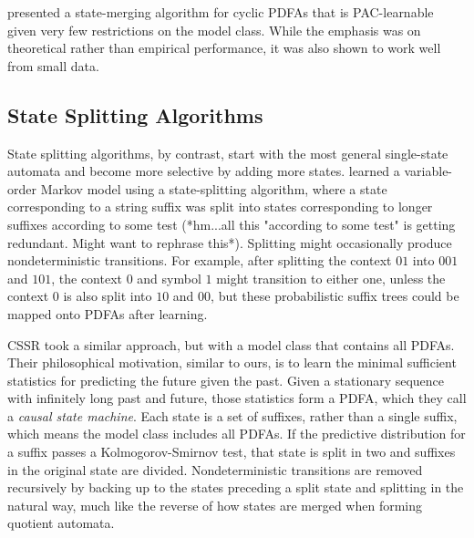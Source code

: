 \cite{Clark2004} presented a state-merging algorithm for cyclic PDFAs that is PAC-learnable given very few restrictions on the model class.  While the emphasis was on theoretical rather than empirical performance, it was also shown to work well from small data.

\subsection{State Splitting Algorithms}

State splitting algorithms, by contrast, start with the most general single-state automata and become more selective by adding more states.  \cite{Ron1995} learned a variable-order Markov model using a state-splitting algorithm, where a state corresponding to a string suffix was split into states corresponding to longer suffixes according to some test (*hm...all this "according to some test" is getting redundant.  Might want to rephrase this*).  Splitting might occasionally produce nondeterministic transitions.  For example, after splitting the context $01$ into $001$ and $101$, the context $0$ and symbol $1$ might transition to either one, unless the context $0$ is also split into $10$ and $00$, but these probabilistic suffix trees could be mapped onto PDFAs after learning.

CSSR \cite{Shalizi2004} took a similar approach, but with a model class that contains all PDFAs.  Their philosophical motivation, similar to ours, is to learn the minimal sufficient statistics for predicting the future given the past.  Given a stationary sequence with infinitely long past and future, those statistics form a PDFA, which they call a {\em causal state machine}.  Each state is a set of suffixes, rather than a single suffix, which means the model class includes all PDFAs.  If the predictive distribution for a suffix passes a Kolmogorov-Smirnov test, that state is split in two and suffixes in the original state are divided.  Nondeterministic transitions are removed recursively by backing up to the states preceding a split state and splitting in the natural way, much like the reverse of how states are merged when forming quotient automata.

